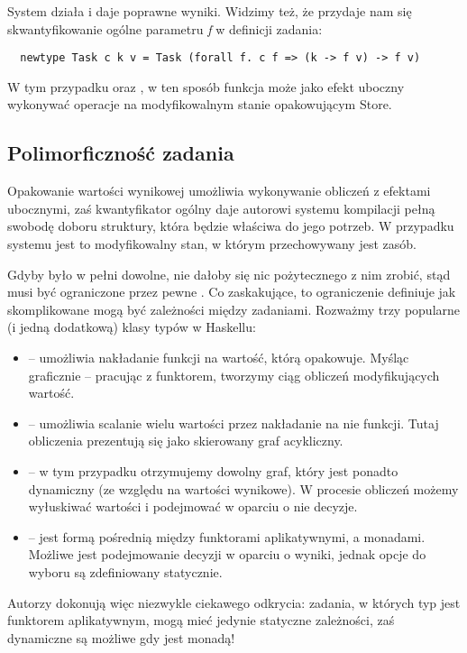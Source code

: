 System działa i daje poprawne wyniki. Widzimy też, że przydaje nam się skwantyfikowanie ogólne parametru \textit{f} w definicji zadania:

\begin{lstlisting}
  newtype Task c k v = Task (forall f. c f => (k -> f v) -> f v)
\end{lstlisting}

W tym przypadku  oraz , w ten sposób funkcja  może jako efekt uboczny wykonywać operacje na modyfikowalnym stanie opakowującym Store.

\subsection{Polimorficzność zadania}

Opakowanie wartości wynikowej umożliwia wykonywanie obliczeń z efektami ubocznymi, zaś kwantyfikator ogólny daje autorowi systemu kompilacji pełną swobodę doboru struktury, która będzie właściwa do jego potrzeb. W przypadku systemu  jest to modyfikowalny stan, w którym przechowywany jest zasób.

Gdyby  było w pełni dowolne, nie dałoby się nic pożytecznego z nim zrobić, stąd musi być ograniczone przez pewne . Co zaskakujące, to ograniczenie definiuje jak skomplikowane mogą być zależności między zadaniami. Rozważmy trzy popularne (i jedną dodatkową) klasy typów w Haskellu:
\begin{itemize}
\item {} -- umożliwia nakładanie funkcji na wartość, którą opakowuje. Myśląc graficznie -- pracując z funktorem, tworzymy ciąg obliczeń modyfikujących wartość.
\item {} -- umożliwia scalanie wielu wartości przez nakładanie na nie funkcji. Tutaj obliczenia prezentują się jako skierowany graf acykliczny.
\item {} -- w tym przypadku otrzymujemy dowolny graf, który jest ponadto dynamiczny (ze względu na wartości wynikowe). W procesie obliczeń możemy wyłuskiwać wartości i podejmować w oparciu o nie decyzje.
\item {}\cite{mokhov2019selective} -- jest formą pośrednią między funktorami aplikatywnymi, a monadami. Możliwe jest podejmowanie decyzji w oparciu o wyniki, jednak opcje do wyboru są zdefiniowany statycznie.
\end{itemize}

Autorzy dokonują więc niezwykle ciekawego odkrycia: zadania, w których typ  jest funktorem aplikatywnym, mogą mieć jedynie statyczne zależności, zaś dynamiczne są możliwe gdy  jest monadą!

